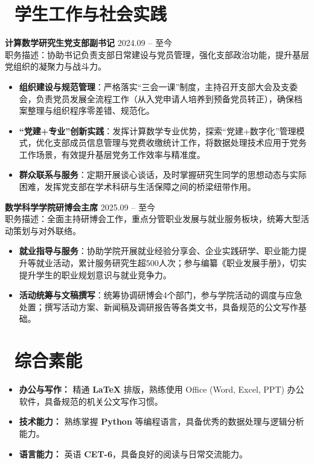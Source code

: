 \documentclass[11pt]{article}
\newlength{\interProjectSpacing}
\newcommand{\projectsep}{\vspace{\interProjectSpacing}}
\newlength{\intraProjectTitleSep}
\newcommand{\titlebreak}{\\[\intraProjectTitleSep]}
\newlength{\intraProjectListTopSep}
\begin{document}
\section{\makebox[\widthof{\faUsers}][c]{\color{CVBlue}\faUsers}\ 学生工作与社会实践}
\textbf{计算数学研究生党支部副书记} \hfill 2024.09 -- 至今 \titlebreak
职务描述：协助书记负责支部日常建设与党员管理，强化支部政治功能，提升基层党组织的凝聚力与战斗力。
\begin{itemize}[nosep, topsep=\intraProjectListTopSep]
    \item \textbf{组织建设与规范管理}：严格落实“三会一课”制度，主持召开支部大会及支委会，负责党员发展全流程工作（从入党申请人培养到预备党员转正），确保档案整理与组织程序零差错、规范化。
    \item \textbf{“党建+专业”创新实践}：发挥计算数学专业优势，探索“党建+数字化”管理模式，优化支部成员信息管理与党费收缴统计工作，将数据处理技术应用于党务工作场景，有效提升基层党务工作效率与精准度。
    \item \textbf{群众联系与服务}：定期开展谈心谈话，及时掌握研究生同学的思想动态与实际困难，发挥党支部在学术科研与生活保障之间的桥梁纽带作用。
\end{itemize}
\projectsep
\textbf{数学科学学院研博会主席} \hfill 2025.09 -- 至今 \titlebreak
职务描述：全面主持研博会工作，重点分管职业发展与就业服务板块，统筹大型活动策划与对外联络。
\begin{itemize}[nosep, topsep=\intraProjectListTopSep]
    \item \textbf{就业指导与服务}：协助学院开展就业经验分享会、企业实践研学、职业能力提升等就业活动，累计服务研究生超500人次；参与编纂《职业发展手册》，切实提升学生的职业规划意识与就业竞争力。
    \item \textbf{活动统筹与文稿撰写}：统筹协调研博会4个部门，参与学院活动的调度与应急处置；撰写活动方案、新闻稿及调研报告等各类文书，具备规范的公文写作基础。
\end{itemize}
\section{\makebox[\widthof{\faCogs}][c]{\color{CVBlue}\faCogs}\ 综合素能}
\begin{itemize}[nosep]
    \item \textbf{办公与写作：} 精通 \textbf{LaTeX} 排版，熟练使用 Office (Word, Excel, PPT) 办公软件，具备规范的机关公文写作习惯。
    \item \textbf{技术能力：} 熟练掌握 \textbf{Python} 等编程语言，具备优秀的数据处理与逻辑分析能力。
    \item \textbf{语言能力：} 英语 \textbf{CET-6}，具备良好的阅读与日常交流能力。
\end{itemize}
\end{document}
